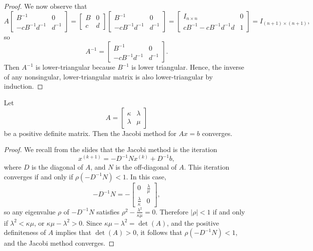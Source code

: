 \documentclass{homework}
\begin{document}
\begin{proof}
		We now observe that
		\begin{equation}
			A\left[\begin{matrix}
				B^{-1} & 0 \\
				-cB^{-1}d^{-1} & d^{-1}
			\end{matrix}\right] = \left[\begin{matrix}
			B & 0 \\
			c & d
			\end{matrix}\right]\left[\begin{matrix}
			B^{-1} & 0 \\
			-cB^{-1}d^{-1} & d^{-1}
			\end{matrix}\right] = \left[\begin{matrix}
				I_{n\times n} & 0 \\
				cB^{-1} - cB^{-1}d^{-1}d & 1
			\end{matrix}\right] = I_{(n+1)\times(n+1)},
		\end{equation}
		so
		\begin{equation}
			A^{-1} = \left[\begin{matrix}
				B^{-1} & 0 \\
				-cB^{-1}d^{-1} & d^{-1}
			\end{matrix}\right].
		\end{equation}
		Then $A^{-1}$ is lower-triangular because $B^{-1}$ is lower triangular. Hence, the inverse of any nonsingular, lower-triangular matrix is also lower-triangular by induction.
	\end{proof}
	
	\question 
	Let
	\begin{equation}
		A = \left[\begin{matrix}
			\kappa & \lambda \\
			\lambda & \mu
		\end{matrix}\right]
	\end{equation}
	be a positive definite matrix. Then the Jacobi method for $Ax = b$ converges.
	
	\begin{proof}
		We recall from the slides that the Jacobi method is the iteration
		\begin{equation}
			x^{(k+1)} = -D^{-1}Nx^{(k)} + D^{-1}b,
		\end{equation}
		where $D$ is the diagonal of $A$, and $N$ is the off-diagonal of $A$. This iteration converges if and only if $\rho(-D^{-1}N) < 1$. In this case,
		\begin{equation}
			-D^{-1}N = -\left[\begin{matrix}
				0 & \frac{\lambda}{\mu} \\
				\frac{\lambda}{\kappa} & 0
			\end{matrix}\right],
		\end{equation}
		so any eigenvalue $\rho$ of $-D^{-1}N$ satisfies $\rho^2 - \frac{\lambda^2}{\kappa\mu} = 0$. Therefore $|\rho| < 1$ if and only if $\lambda^2 < \kappa\mu$, or $\kappa \mu  -\lambda^2 > 0$. Since $\kappa\mu - \lambda^2 = \det(A)$, and the positive definiteness of $A$ implies that $\det(A) > 0$, it follows that $\rho(-D^{-1}N) < 1$, and the Jacobi method converges.
	\end{proof}
	
\end{document}
